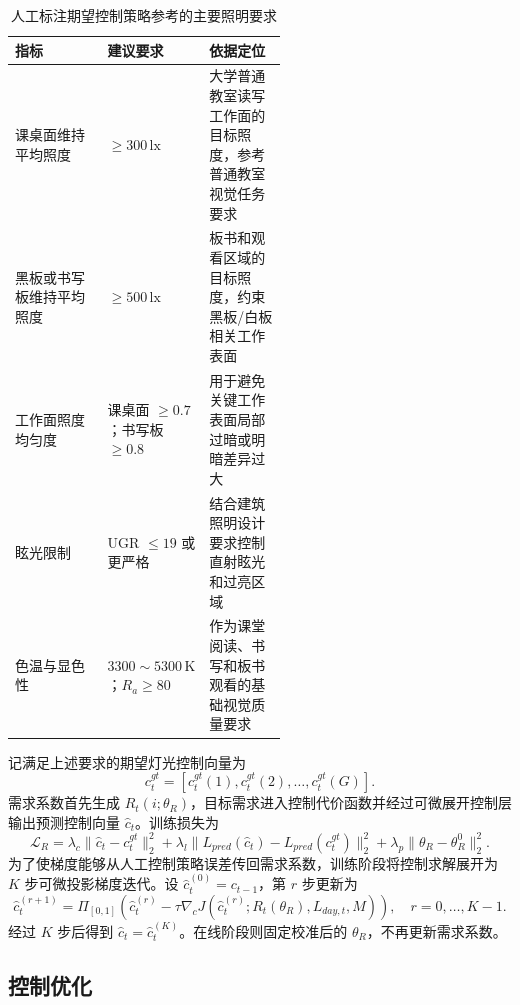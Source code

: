\documentclass[UTF8,a4paper,zihao=-4]{ctexart}
\begin{document}
\begin{table}[H]
  \centering
  \small
  \caption{人工标注期望控制策略参考的主要照明要求}
  \label{tab:lighting-reference}
  \begin{tabularx}{\linewidth}{>{\raggedright\arraybackslash}p{0.34\linewidth}>{\raggedright\arraybackslash}p{0.20\linewidth}>{\raggedright\arraybackslash}X}
    \toprule
    指标 & 建议要求 & 依据定位 \\
    \midrule
    课桌面维持平均照度 & $\geq 300\,\mathrm{lx}$ & 大学普通教室读写工作面的目标照度，参考普通教室视觉任务要求 \\
    黑板或书写板维持平均照度 & $\geq 500\,\mathrm{lx}$ & 板书和观看区域的目标照度，约束黑板/白板相关工作表面 \\
    工作面照度均匀度 & 课桌面 $\geq 0.7$；书写板 $\geq 0.8$ & 用于避免关键工作表面局部过暗或明暗差异过大 \\
    眩光限制 & UGR $\leq 19$ 或更严格 & 结合建筑照明设计要求控制直射眩光和过亮区域 \\
    色温与显色性 & $3300\sim 5300\,\mathrm{K}$；$R_a\geq 80$ & 作为课堂阅读、书写和板书观看的基础视觉质量要求 \\
    \bottomrule
  \end{tabularx}
\end{table}

记满足上述要求的期望灯光控制向量为
\begin{equation}
c_t^{gt}=[c_t^{gt}(1),c_t^{gt}(2),\ldots,c_t^{gt}(G)].
\end{equation}
需求系数首先生成 $R_t(i;\theta_R)$，目标需求进入控制代价函数并经过可微展开控制层输出预测控制向量 $\widehat{c}_t$。训练损失为
\begin{equation}
\mathcal{L}_R=\lambda_c\|\widehat{c}_t-c_t^{gt}\|_2^2+\lambda_l\|L_{pred}(\widehat{c}_t)-L_{pred}(c_t^{gt})\|_2^2+\lambda_p\|\theta_R-\theta_R^0\|_2^2 .
\end{equation}
为了使梯度能够从人工控制策略误差传回需求系数，训练阶段将控制求解展开为 $K$ 步可微投影梯度迭代。设 $\widehat{c}_t^{(0)}=c_{t-1}$，第 $r$ 步更新为
\begin{equation}
\widehat{c}_t^{(r+1)}=\Pi_{[0,1]}\left(\widehat{c}_t^{(r)}-\tau\nabla_cJ(\widehat{c}_t^{(r)};R_t(\theta_R),L_{day,t},M)\right),\quad r=0,\ldots,K-1.
\end{equation}
经过 $K$ 步后得到 $\widehat{c}_t=\widehat{c}_t^{(K)}$。在线阶段则固定校准后的 $\theta_R$，不再更新需求系数。

\subsection{控制优化}
\end{document}
